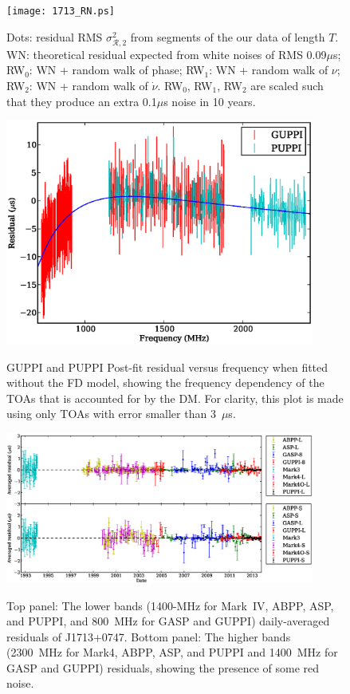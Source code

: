 \documentclass[12pt,preprint]{aastex}
\newcommand{\msR}{\mathscr{R}}
\begin{document}
\begin{figure}
\texttt{[image: 1713\_RN.ps]} \\ 
\caption{\label{fig:TN}
Dots: residual RMS $\sigma^2_{\msR,2}$ from segments of the our data of length $T$.  
WN: theoretical residual expected from white noises of RMS 0.09$\mu$s; RW$_0$:
WN + random walk of phase; RW$_1$: WN + random walk of $\nu$; RW$_2$: WN +
random walk of $\dot{\nu}$. RW$_0$, RW$_1$, RW$_2$ are scaled such that they
produce an extra 0.1$\mu$s noise in 10 years.
} 
\end{figure} 

\begin{figure}
\includegraphics[width=4in]{FD.ps} \\ 
\caption {\label{fig:FD} GUPPI and PUPPI Post-fit residual versus frequency when fitted
without the FD model, showing the frequency dependency of the TOAs that is 
accounted for by the DM. For
clarity, this plot is made using only TOAs with error smaller than 3~$\mu$s.} 
\end{figure} 

\begin{figure}
\includegraphics[width=4in]{residual.eps} \\ 
\caption {\label{fig:res} Top panel: The lower bands (1400-MHz for
Mark~IV, ABPP, ASP, and PUPPI, and 800~MHz for GASP and GUPPI) daily-averaged residuals of
J1713+0747. Bottom panel: The higher bands (2300~MHz for Mark4, ABPP, ASP, and PUPPI and
1400~MHz for GASP and GUPPI) residuals, showing the presence of some red noise.} 
\end{figure} 
\end{document}
